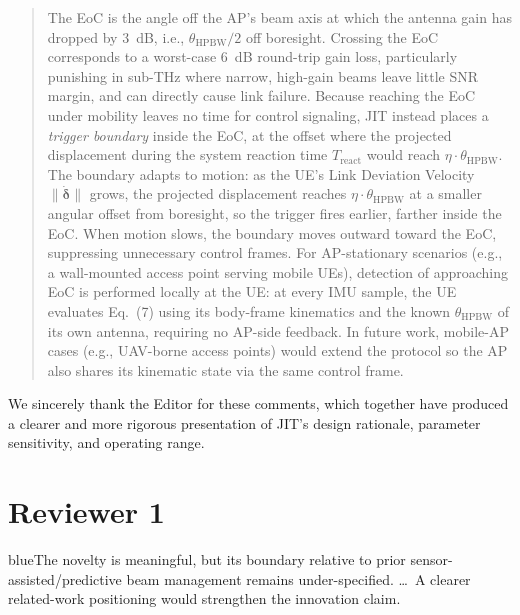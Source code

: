 \documentclass{article}
\newcommand{\blue}[1]{\begin{color}{blue}#1\end{color}}
\begin{document}
\begin{quote}
{\color{cyan!75!black}
The EoC is the angle off the AP's beam axis at which the antenna gain has dropped by \SI{3}{\deci\bel}, i.e., $\theta_{\text{HPBW}}/2$ off boresight. Crossing the EoC corresponds to a worst-case \SI{6}{\deci\bel} round-trip gain loss, particularly punishing in sub-THz where narrow, high-gain beams leave little SNR margin, and can directly cause link failure. Because reaching the EoC under mobility leaves no time for control signaling, JIT instead places a \emph{trigger boundary} inside the EoC, at the offset where the projected displacement during the system reaction time $T_{\text{react}}$ would reach $\eta \cdot \theta_{\text{HPBW}}$. The boundary adapts to motion: as the UE's Link Deviation Velocity $\|\dot{\boldsymbol{\delta}}\|$ grows, the projected displacement reaches $\eta \cdot \theta_{\text{HPBW}}$ at a smaller angular offset from boresight, so the trigger fires earlier, farther inside the EoC. When motion slows, the boundary moves outward toward the EoC, suppressing unnecessary control frames. For AP-stationary scenarios (e.g., a wall-mounted access point serving mobile UEs), detection of approaching EoC is performed locally at the UE: at every IMU sample, the UE evaluates Eq.~(7) using its body-frame kinematics and the known $\theta_{\text{HPBW}}$ of its own antenna, requiring no AP-side feedback. In future work, mobile-AP cases (e.g., UAV-borne access points) would extend the protocol so the AP also shares its kinematic state via the same control frame.
}
\end{quote}

\bigskip
\noindent We sincerely thank the Editor for these comments, which together have produced a clearer and more rigorous presentation of JIT's design rationale, parameter sensitivity, and operating range.

\newpage

\section*{Reviewer 1}

\begin{tcbremark}
{\selectfont
\blue{The novelty is meaningful, but its boundary relative to prior sensor-assisted/predictive beam management remains under-specified. \dots\ A clearer related-work positioning would strengthen the innovation claim.}
}
\end{tcbremark}
\end{document}
